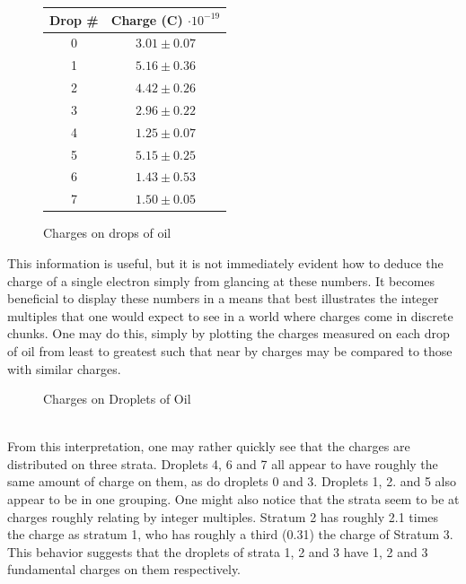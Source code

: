 \documentclass[]{article}
\begin{document}
\begin{figure}[h]
	\centering
	\caption{Charges on drops of oil}
	\begin{tabular}{|c|c|}
		\hline
		Drop \# & Charge (C) \( \cdot 10^{-19}\) \\ \hline
		0 & \(3.01 \pm 0.07 \) \\
		1 & \(5.16 \pm 0.36 \) \\
		2 & \(4.42 \pm 0.26 \) \\
		3 & \(2.96 \pm 0.22 \) \\
		4 & \(1.25 \pm 0.07 \) \\
		5 & \(5.15 \pm 0.25 \) \\
		6 & \(1.43 \pm 0.53 \) \\
		7 & \(1.50 \pm 0.05 \) \\ \hline
		
	\end{tabular}
\end{figure}
This information is useful, but it is not immediately evident how to deduce the charge of a single electron simply from glancing at these numbers. It becomes beneficial to display these numbers in a means that best illustrates the integer multiples that one would expect to see in a world where charges come in discrete chunks. One may do this, simply by plotting the charges measured on each drop of oil from least to greatest such that near by charges may be compared to those with similar charges.
\begin{figure}[h]
	\centering
	\caption{Charges on Droplets of Oil}

\end{figure}
\\
From this interpretation, one may rather quickly see that the charges are distributed on three strata. Droplets 4, 6 and 7 all appear to have roughly the same amount of charge on them, as do droplets 0 and 3. Droplets 1, 2. and 5 also appear to be in one grouping. One might also notice that the strata seem to be at charges roughly relating by integer multiples. Stratum 2 has roughly 2.1 times the charge as stratum 1, who has roughly a third (0.31) the charge of Stratum 3. This behavior suggests that the droplets of strata 1, 2 and 3 have 1, 2 and 3 fundamental charges on them respectively.
\end{document}
